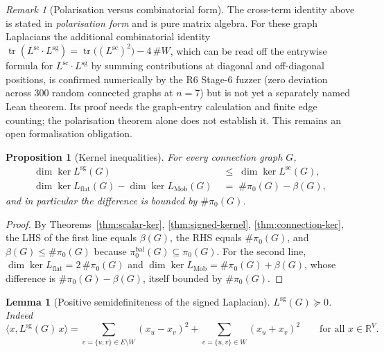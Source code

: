 \documentclass[11pt,a4paper]{amsart}
\theoremstyle{plain}
\newtheorem{proposition}[theorem]{Proposition}
\newtheorem{lemma}[theorem]{Lemma}
\theoremstyle{definition}
\theoremstyle{remark}
\newtheorem{remark}[theorem]{Remark}
\DeclareMathOperator{\Ker}{ker}
\DeclareMathOperator{\tr}{tr}
\newcommand{\RR}{\mathbb{R}}
\newcommand{\Lscalar}{L^{\operatorname{sc}}}
\newcommand{\Lsigned}{L^{\operatorname{sg}}}
\newcommand{\comp}{\pi_0}
\newcommand{\pair}[2]{\langle #1, #2 \rangle}
\begin{document}
\begin{remark}[Polarisation versus combinatorial form]
The cross-term identity above is stated in \emph{polarisation form}
and is pure matrix algebra. For these graph Laplacians the additional
combinatorial identity
$\tr(\Lscalar\cdot\Lsigned)=\tr\bigl((\Lscalar)^{2}\bigr)-4\,\#W$, which can be
read off the entrywise formula for $\Lscalar\cdot\Lsigned$ by
summing contributions at diagonal and off-diagonal positions, is
confirmed numerically by the R6 Stage-6 fuzzer (zero deviation
across $300$ random connected graphs at $n=7$) but is not yet a
separately named Lean theorem. Its proof needs the graph-entry
calculation and finite edge counting; the polarisation theorem alone
does not establish it. This remains an open formalisation obligation.
\end{remark}

\begin{proposition}[Kernel inequalities]\label{prop:kernel-ineq}
For every connection graph $G$,
\begin{align*}
  \dim\Ker \Lsigned(G) \;&\le\; \dim\Ker \Lscalar(G), \\
  \dim\Ker L_{\mathrm{flat}}(G) - \dim\Ker L_{\mathrm{Mob}}(G)
    \;&=\; \#\comp(G) - \beta(G),
\end{align*}
and in particular the difference is bounded by $\#\comp(G)$.
\end{proposition}

\begin{proof}
By Theorems~\ref{thm:scalar-ker}, \ref{thm:signed-kernel},
\ref{thm:connection-ker}, the LHS of the first line equals
$\beta(G)$, the RHS equals $\#\comp(G)$, and
$\beta(G)\le \#\comp(G)$ because
$\comp^{\mathrm{bal}}(G)\subseteq \comp(G)$. For the second line,
$\dim\Ker L_{\mathrm{flat}} = 2\,\#\comp(G)$ and
$\dim\Ker L_{\mathrm{Mob}} = \#\comp(G)+\beta(G)$, whose difference
is $\#\comp(G)-\beta(G)$, itself bounded by $\#\comp(G)$.
\end{proof}

\begin{lemma}[Positive semidefiniteness of the signed
Laplacian]\label{lem:signed-psd}
$\Lsigned(G) \succeq 0$. Indeed
\[
  \pair{x}{\Lsigned(G)\, x}
  = \!\!\sum_{e=\{u,v\}\in E\setminus W}\! (x_u - x_v)^2
  + \sum_{e=\{u,v\}\in W} (x_u + x_v)^2
\qquad \text{for all } x\in\RR^V.
\]
\end{lemma}
\end{document}
